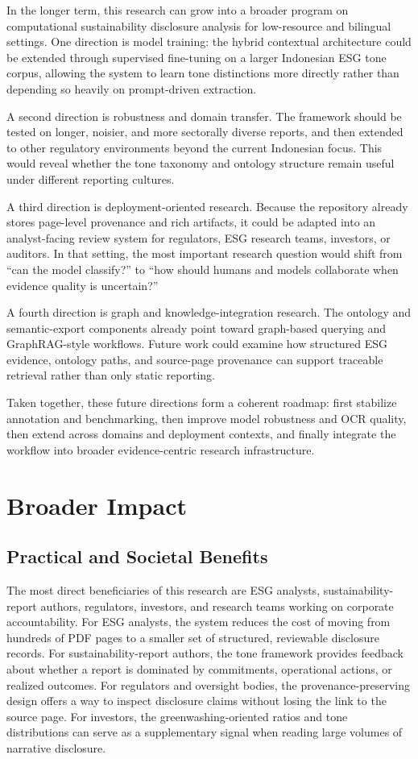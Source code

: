 In the longer term, this research can grow into a broader program on computational sustainability disclosure analysis for low-resource and bilingual settings. One direction is model training: the hybrid contextual architecture could be extended through supervised fine-tuning on a larger Indonesian ESG tone corpus, allowing the system to learn tone distinctions more directly rather than depending so heavily on prompt-driven extraction.

A second direction is robustness and domain transfer. The framework should be tested on longer, noisier, and more sectorally diverse reports, and then extended to other regulatory environments beyond the current Indonesian focus. This would reveal whether the tone taxonomy and ontology structure remain useful under different reporting cultures.

A third direction is deployment-oriented research. Because the repository already stores page-level provenance and rich artifacts, it could be adapted into an analyst-facing review system for regulators, ESG research teams, investors, or auditors. In that setting, the most important research question would shift from “can the model classify?” to “how should humans and models collaborate when evidence quality is uncertain?”

A fourth direction is graph and knowledge-integration research. The ontology and semantic-export components already point toward graph-based querying and GraphRAG-style workflows. Future work could examine how structured ESG evidence, ontology paths, and source-page provenance can support traceable retrieval rather than only static reporting.

Taken together, these future directions form a coherent roadmap: first stabilize annotation and benchmarking, then improve model robustness and OCR quality, then extend across domains and deployment contexts, and finally integrate the workflow into broader evidence-centric research infrastructure.

\section{Broader Impact}
\subsection{Practical and Societal Benefits}

The most direct beneficiaries of this research are ESG analysts, sustainability-report authors, regulators, investors, and research teams working on corporate accountability. For ESG analysts, the system reduces the cost of moving from hundreds of PDF pages to a smaller set of structured, reviewable disclosure records. For sustainability-report authors, the tone framework provides feedback about whether a report is dominated by commitments, operational actions, or realized outcomes. For regulators and oversight bodies, the provenance-preserving design offers a way to inspect disclosure claims without losing the link to the source page. For investors, the greenwashing-oriented ratios and tone distributions can serve as a supplementary signal when reading large volumes of narrative disclosure.

